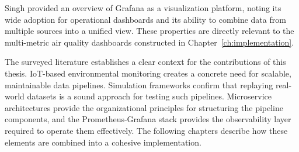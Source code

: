Singh\cite{grafana} provided an overview of Grafana as a visualization platform, noting its wide adoption for operational dashboards and its ability to combine data from multiple sources into a unified view. These properties are directly relevant to the multi-metric air quality dashboards constructed in Chapter~\ref{ch:implementation}.


The surveyed literature establishes a clear context for the contributions of this thesis. IoT-based environmental monitoring creates a concrete need for scalable, maintainable data pipelines. Simulation frameworks confirm that replaying real-world datasets is a sound approach for testing such pipelines. Microservice architectures provide the organizational principles for structuring the pipeline components, and the Prometheus-Grafana stack provides the observability layer required to operate them effectively. The following chapters describe how these elements are combined into a cohesive implementation.
